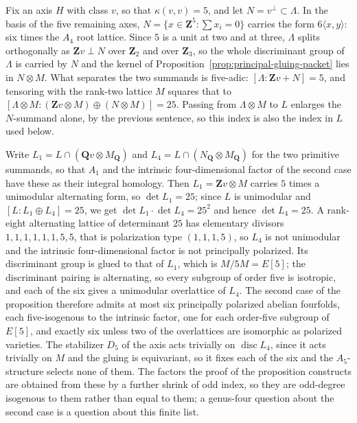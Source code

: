 \begin{remark}
\label{rem:four-dimensional-factor}
Fix an axis \(H\) with class \(v\), so that \(\kappa(v,v)=5\), and let
\(N=v^\perp\subset\Lambda\).  In the basis of the five remaining axes,
\(N=\{x\in\mathbf Z^5:\sum x_i=0\}\) carries the form \(6\langle x,y\rangle\):
six times the \(A_4\) root lattice.  Since \(5\) is a unit at two and at three,
\(\Lambda\) splits orthogonally as \(\mathbf Zv\perp N\) over \(\mathbf Z_2\)
and over \(\mathbf Z_3\), so the whole discriminant group of \(\Lambda\) is
carried by \(N\) and the kernel of
Proposition~\ref{prop:principal-gluing-packet} lies in \(N\otimes M\).  What
separates the two summands is five-adic:
\([\Lambda:\mathbf Zv+N]=5\), and tensoring with the rank-two lattice \(M\)
squares that to
\([\Lambda\otimes M:(\mathbf Zv\otimes M)\oplus(N\otimes M)]=25\).
Passing from \(\Lambda\otimes M\) to \(L\) enlarges the \(N\)-summand alone, by
the previous sentence, so this index is also the index in \(L\) used below.

Write \(L_1=L\cap(\mathbf Qv\otimes M_{\mathbf Q})\) and
\(L_4=L\cap(N_{\mathbf Q}\otimes M_{\mathbf Q})\) for the two primitive
summands, so that \(A_1\) and the intrinsic four-dimensional factor of the
second case have these as their integral homology.  Then \(L_1=\mathbf Zv\otimes
M\) carries \(5\) times a unimodular alternating form, so \(\det L_1=25\); since
\(L\) is unimodular and \([L:L_1\oplus L_4]=25\), we get
\(\det L_1\cdot\det L_4=25^2\) and hence \(\det L_4=25\).  A rank-eight
alternating lattice of determinant \(25\) has elementary divisors
\(1,1,1,1,1,1,5,5\), that is polarization type \((1,1,1,5)\), so \(L_4\) is not
unimodular and the intrinsic four-dimensional factor is not principally
polarized.  Its discriminant group is glued to that
of \(L_1\), which is \(M/5M=E[5]\); the discriminant pairing is alternating, so
every subgroup of order five is isotropic, and each of the six gives a
unimodular overlattice of \(L_4\).  The second case of the proposition
therefore admits at most six principally polarized abelian fourfolds, each
five-isogenous to the intrinsic factor, one for each order-five subgroup of
\(E[5]\), and exactly six unless two of the overlattices are isomorphic as
polarized varieties.  The stabilizer \(D_5\) of the axis acts trivially on
\(\operatorname{disc}L_4\), since it acts trivially on \(M\) and the gluing is
equivariant, so it fixes each of the six and the \(A_5\)-structure selects none
of them.  The factors the proof of the proposition constructs are obtained from
these by a further shrink of odd index, so they are odd-degree isogenous to
them rather than equal to them; a genus-four question about the second case is
a question about this finite list.
\end{remark}
